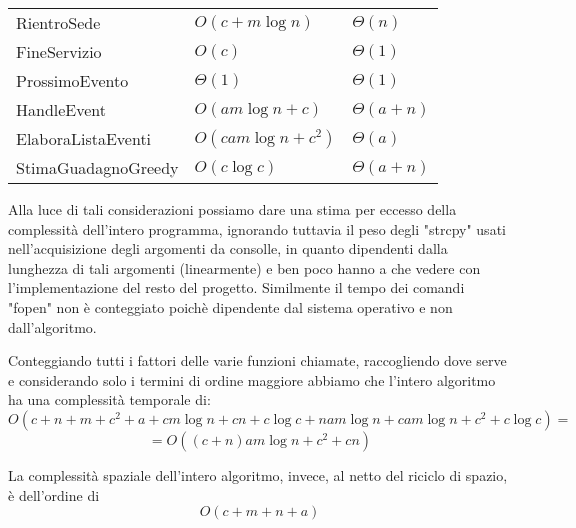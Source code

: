 \documentclass[a4paper,11pt]{Article}
\newcommand\T{\rule{0pt}{2.6ex}}       %
\newcommand\B{\rule[-1.2ex]{0pt}{0pt}} %
\begin{document}
\begin{tabular}{p{3.8cm}p{4cm}p{4cm}}
RientroSede                     & $O(c + m\log{n})$               & $\Theta(n)$ \T\\
FineServizio                    & $O(c)$                          & $\Theta(1)$ \T\\
ProssimoEvento                  & $\Theta(1)$                     & $\Theta(1)$ \T\\
HandleEvent                     & $O(am\log{n} + c)$              & $\Theta(a + n)$ \T\\
ElaboraListaEventi              & $O(cam\log{n} +c^2)$            & $\Theta(a)$ \T\\
StimaGuadagnoGreedy             & $O(c\log{c})$                   & $\Theta(a + n)$ \T\B\\
\end{tabular}


\bigskip

Alla luce di tali considerazioni possiamo dare una stima per eccesso della complessità dell'intero programma, ignorando tuttavia il peso degli "strcpy" usati nell'acquisizione degli argomenti da consolle, in quanto dipendenti dalla lunghezza di tali argomenti (linearmente) e ben poco hanno a che vedere con l'implementazione del resto del progetto.
Similmente il tempo dei comandi "fopen" non è conteggiato poichè dipendente dal sistema operativo e non dall'algoritmo.

Conteggiando tutti i fattori delle varie funzioni chiamate, raccogliendo dove serve e considerando solo i termini di ordine maggiore abbiamo che l'intero algoritmo ha una complessità temporale di:
\[O(c+n+m+c^2+a+cm\log{n}+cn + c\log{c}+nam\log{n}+cam\log{n}+c^2+c\log{c}) =\]
\[ = O((c+n)am\log{n}+c^2+cn)\]

La complessità spaziale dell'intero algoritmo, invece, al netto del riciclo di spazio, è dell'ordine di
\[O(c + m + n + a)\]
\end{document}
